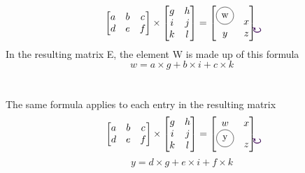 \documentclass{article}
\newcommand{\tikzmark}[1]{\tikz[overlay,remember picture] \node (#1) {};}
\begin{document}
\[
\begin{bmatrix}
    \tikzmark{a}a  &  \tikzmark{c}b & \tikzmark{e}c      \\
    d  &  e & f      
\end{bmatrix}
\times
\begin{bmatrix}
    \tikzmark{b}g &  h      \\
    \tikzmark{d}i  &  j        \\
    \tikzmark{f}k  &  l
\end{bmatrix}
=
\begin{bmatrix}
    \tikz \node[draw,circle]{w};  & x      \\
    y  &  z
\end{bmatrix}
\begin{tikzpicture}[overlay,remember picture,out=315,in=225,distance=0.4cm]
    \draw[->,red,shorten >=3pt,shorten <=3pt] (a.center) to (b.center);
	\draw[->,blue,shorten >=3pt,shorten <=3pt] (c.center) to (d.center);
	\draw[->,black,shorten >=3pt,shorten <=3pt] (e.center) to (f.center);
\end{tikzpicture}
\]
In the resulting matrix E, the element W is made up of this formula 
\begin{equation}
w= a \times g + b \times i + c \times k
\end{equation}
\\
\\
The same formula applies to each entry in the resulting matrix
\[
\begin{bmatrix}
    a  &  b & c      \\
    \tikzmark{a}d  &  \tikzmark{c}e & \tikzmark{e}f      
\end{bmatrix}
\times
\begin{bmatrix}
    \tikzmark{b}g &  h      \\
    \tikzmark{d}i  &  j        \\
    \tikzmark{f}k  &  l
\end{bmatrix}
=
\begin{bmatrix}
    w  & x      \\
    \tikz \node[draw,circle]{y};  &  z
\end{bmatrix}
\\
\\
\begin{tikzpicture}[overlay,remember picture,out=315,in=225,distance=0.4cm]
    \draw[->,red,shorten >=3pt,shorten <=3pt] (a.center) to (b.center);
	\draw[->,blue,shorten >=3pt,shorten <=3pt] (c.center) to (d.center);
	\draw[->,black,shorten >=3pt,shorten <=3pt] (e.center) to (f.center);
\end{tikzpicture}
\]
\begin{equation}
y= d \times g + e \times i + f \times k
\end{equation}
\\
\\
\end{document}
